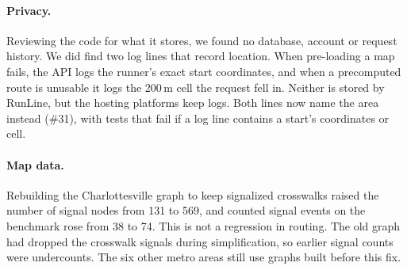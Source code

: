 \paragraph{Privacy.}
Reviewing the code for what it stores, we found no database, account or
request history. We did find two log lines that record location. When
pre-loading a map fails, the API logs the runner's exact start coordinates,
and when a precomputed route is unusable it logs the 200\,m cell the request
fell in. Neither is stored by RunLine, but the hosting platforms keep logs.
Both lines now name the area instead (\#31), with tests that fail if a log
line contains a start's coordinates or cell.

\paragraph{Map data.}
Rebuilding the Charlottesville graph to keep signalized crosswalks raised the
number of signal nodes from 131 to 569, and counted signal events on the
benchmark rose from 38 to 74. This is not a regression in routing. The old
graph had dropped the crosswalk signals during simplification, so earlier
signal counts were undercounts. The six other metro areas still use graphs
built before this fix.
